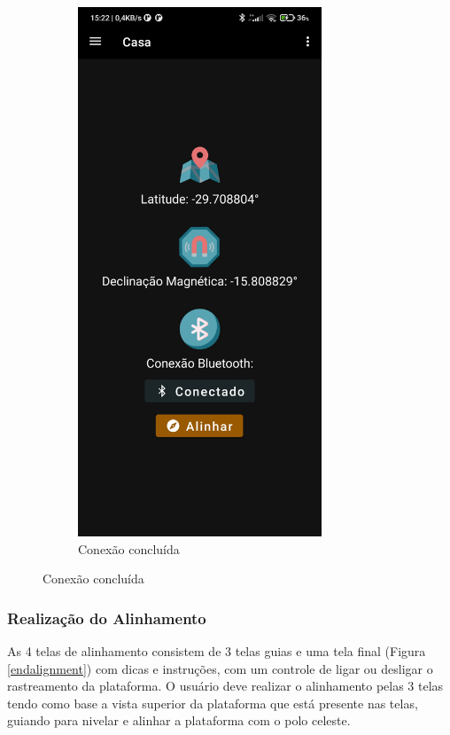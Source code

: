 \begin{figure}[!htb]
\begin{subfigure}[b]{0.3\textwidth}
		\includegraphics[width=0.8\textwidth]{figuras/desAplicativo/conectado}
		\caption{Conexão concluída}
	\end{subfigure}
\end{figure}




\subsubsection{Realização do Alinhamento}
As 4 telas de alinhamento consistem de 3 telas guias e uma tela final (Figura \ref{endalignment}) com dicas e instruções, com um controle de ligar ou desligar o rastreamento da plataforma. O usuário deve realizar o alinhamento pelas 3 telas tendo como base a vista superior da plataforma que está presente nas telas, guiando para nivelar e alinhar a plataforma com o polo celeste. 

